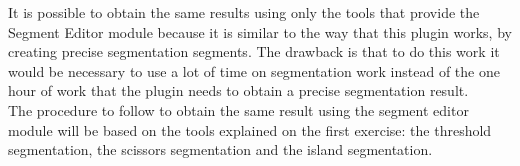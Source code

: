 It is possible to obtain the same results using only the tools that provide the Segment Editor module because it is similar to the way that this plugin works, by creating precise segmentation segments. The drawback is that to do this work it would be necessary to use a lot of time on segmentation work instead of the one hour of work that the plugin needs to obtain a precise segmentation result. \\

The procedure to follow to obtain the same result using the segment editor module will be based on the tools explained on the first exercise: the threshold segmentation, the scissors segmentation and the island segmentation.  
